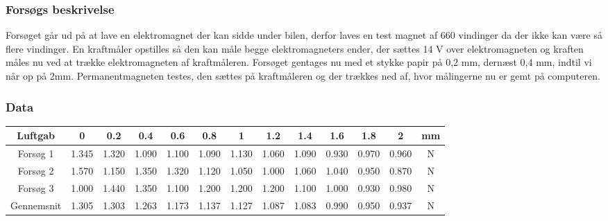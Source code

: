 \subsubsection*{Forsøgs beskrivelse}
Forsøget går ud på at lave en elektromagnet der kan sidde under bilen, derfor laves en test magnet af 660 vindinger da der ikke kan være så flere vindinger. En kraftmåler opstilles så den kan måle begge elektromagneters ender, der sættes 14 V over elektromagneten og kraften måles nu ved at trække elektromagneten af kraftmåleren. Forsøget gentages nu med et stykke papir på 0,2 mm, dernæst 0,4 mm, indtil vi når op på 2mm. Permanentmagneten testes, den sættes på kraftmåleren og der trækkes ned af, hvor målingerne nu er gemt på computeren.

\subsubsection*{Data}
\begin{tabular}{|c|c|c|c|c|c|c|c|c|c|c|c|c|}
\hline 
Luftgab & 0 & 0.2 & 0.4 & 0.6 & 0.8 & 1 & 1.2 & 1.4 & 1.6 & 1.8 & 2 & mm \\ 
\hline 
Forsøg 1 & 1.345 & 1.320 & 1.090 & 1.100 & 1.090 & 1.130 & 1.060 & 1.090 & 0.930 & 0.970 & 0.960 & N \\ 
\hline 
Forsøg 2 & 1.570 & 1.150 & 1.350 & 1.320 & 1.120 & 1.050 & 1.000 & 1.060 & 1.040 & 0.950 & 0.870 & N \\ 
\hline 
Forsøg 3 & 1.000 & 1.440 & 1.350 & 1.100 & 1.200 & 1.200 & 1.200 & 1.100 & 1.000 & 0.930 & 0.980 & N \\ 
\hline 
Gennemsnit & 1.305 & 1.303 & 1.263 & 1.173 & 1.137 & 1.127 & 1.087 & 1.083 & 0.990 & 0.950 & 0.937 & N \\ 
\hline 
\end{tabular} 
